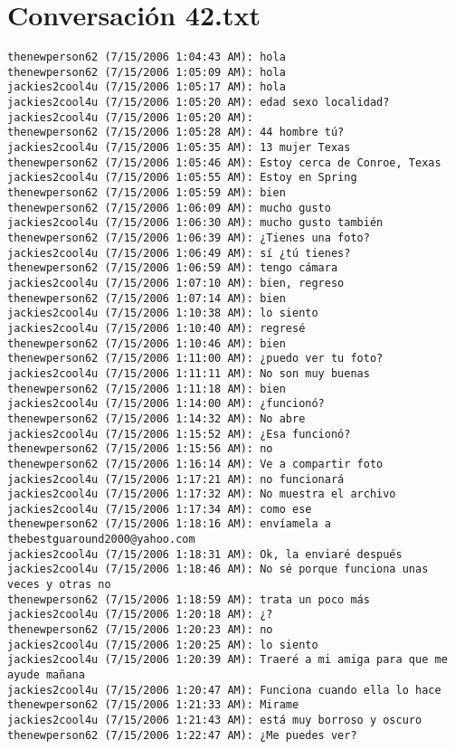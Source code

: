 \section{Conversaci\'on 42.txt}

\begin{verbatim}
thenewperson62 (7/15/2006 1:04:43 AM): hola
thenewperson62 (7/15/2006 1:05:09 AM): hola
jackies2cool4u (7/15/2006 1:05:17 AM): hola
jackies2cool4u (7/15/2006 1:05:20 AM): edad sexo localidad?
jackies2cool4u (7/15/2006 1:05:20 AM): 
thenewperson62 (7/15/2006 1:05:28 AM): 44 hombre tú?
jackies2cool4u (7/15/2006 1:05:35 AM): 13 mujer Texas
thenewperson62 (7/15/2006 1:05:46 AM): Estoy cerca de Conroe, Texas
jackies2cool4u (7/15/2006 1:05:55 AM): Estoy en Spring
thenewperson62 (7/15/2006 1:05:59 AM): bien
thenewperson62 (7/15/2006 1:06:09 AM): mucho gusto
jackies2cool4u (7/15/2006 1:06:30 AM): mucho gusto también
thenewperson62 (7/15/2006 1:06:39 AM): ¿Tienes una foto?
jackies2cool4u (7/15/2006 1:06:49 AM): sí ¿tú tienes?
thenewperson62 (7/15/2006 1:06:59 AM): tengo cámara
jackies2cool4u (7/15/2006 1:07:10 AM): bien, regreso
thenewperson62 (7/15/2006 1:07:14 AM): bien
jackies2cool4u (7/15/2006 1:10:38 AM): lo siento
jackies2cool4u (7/15/2006 1:10:40 AM): regresé
thenewperson62 (7/15/2006 1:10:46 AM): bien
thenewperson62 (7/15/2006 1:11:00 AM): ¿puedo ver tu foto?
jackies2cool4u (7/15/2006 1:11:11 AM): No son muy buenas
thenewperson62 (7/15/2006 1:11:18 AM): bien
jackies2cool4u (7/15/2006 1:14:00 AM): ¿funcionó?
thenewperson62 (7/15/2006 1:14:32 AM): No abre
jackies2cool4u (7/15/2006 1:15:52 AM): ¿Esa funcionó?
thenewperson62 (7/15/2006 1:15:56 AM): no
thenewperson62 (7/15/2006 1:16:14 AM): Ve a compartir foto
jackies2cool4u (7/15/2006 1:17:21 AM): no funcionará
jackies2cool4u (7/15/2006 1:17:32 AM): No muestra el archivo
jackies2cool4u (7/15/2006 1:17:34 AM): como ese
thenewperson62 (7/15/2006 1:18:16 AM): envíamela a thebestguaround2000@yahoo.com
jackies2cool4u (7/15/2006 1:18:31 AM): Ok, la enviaré después
jackies2cool4u (7/15/2006 1:18:46 AM): No sé porque funciona unas veces y otras no
thenewperson62 (7/15/2006 1:18:59 AM): trata un poco más
jackies2cool4u (7/15/2006 1:20:18 AM): ¿?
thenewperson62 (7/15/2006 1:20:23 AM): no
jackies2cool4u (7/15/2006 1:20:25 AM): lo siento
jackies2cool4u (7/15/2006 1:20:39 AM): Traeré a mi amiga para que me ayude mañana
jackies2cool4u (7/15/2006 1:20:47 AM): Funciona cuando ella lo hace
thenewperson62 (7/15/2006 1:21:33 AM): Mirame
jackies2cool4u (7/15/2006 1:21:43 AM): está muy borroso y oscuro
thenewperson62 (7/15/2006 1:22:47 AM): ¿Me puedes ver?

\end{verbatim}
